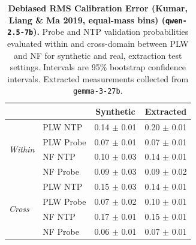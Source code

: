 \begin{table}[ht]
\centering
\begin{tabular}{ll cc}
\toprule
& & Synthetic & Extracted \\
\midrule
\multirow{4}{*}{\textit{Within}}
& PLW NTP & 0.14 $\pm$ 0.01 & 0.20 $\pm$ 0.01 \\
& PLW Probe & 0.07 $\pm$ 0.01 & 0.07 $\pm$ 0.01 \\
& NF NTP & 0.10 $\pm$ 0.03 & 0.14 $\pm$ 0.01 \\
& NF Probe & 0.09 $\pm$ 0.03 & 0.09 $\pm$ 0.02 \\
\midrule
\multirow{4}{*}{\textit{Cross}}
& PLW NTP & 0.15 $\pm$ 0.03 & 0.14 $\pm$ 0.01 \\
& PLW Probe & 0.07 $\pm$ 0.02 & 0.10 $\pm$ 0.01 \\
& NF NTP & 0.17 $\pm$ 0.01 & 0.15 $\pm$ 0.01 \\
& NF Probe & 0.06 $\pm$ 0.01 & 0.07 $\pm$ 0.01 \\
\bottomrule
\end{tabular}
\caption{\textbf{Debiased RMS Calibration Error (Kumar, Liang \& Ma 2019, equal-mass bins) (\texttt{qwen-2.5-7b}).} Probe and NTP validation probabilities evaluated within and cross-domain between PLW and NF for synthetic and real, extraction test settings. Intervals are 95\% bootstrap confidence intervals. Extracted measurements collected from \texttt{gemma-3-27b}.}
\label{tab:qwen-2.5-7b-gemma-3-27b-pond_nfix-rmsce_db}
\end{table}

